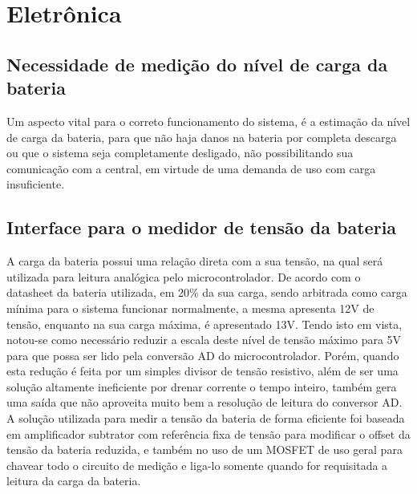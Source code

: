 \section{Eletrônica}

\subsection{Necessidade de medição do nível de carga da bateria}

Um aspecto vital para o correto funcionamento do sistema, é a estimação da nível de carga da bateria, para que não haja danos na bateria por completa descarga ou que o sistema seja completamente desligado, não possibilitando sua comunicação com a central, em virtude de uma demanda de uso com carga insuficiente.

\subsection{Interface para o medidor de tensão da bateria}

A carga da bateria possui uma relação direta com a sua tensão, na qual será utilizada para leitura analógica pelo microcontrolador. De acordo com o datasheet da bateria utilizada, em 20\% da sua carga, sendo arbitrada como carga mínima para o sistema funcionar normalmente, a mesma apresenta 12V de tensão, enquanto na sua carga máxima, é apresentado 13V.
Tendo isto em vista, notou-se como necessário reduzir a escala deste nível de tensão máximo para 5V para que possa ser lido pela conversão AD do microcontrolador. Porém, quando esta redução é feita por um simples divisor de tensão resistivo, além de ser uma solução altamente ineficiente por drenar corrente o tempo inteiro, também gera uma saída que não aproveita muito bem a resolução de leitura do conversor AD.
A solução utilizada para medir a tensão da bateria de forma eficiente foi baseada em amplificador subtrator com referência fixa de tensão para modificar o offset da tensão da bateria reduzida, e também no uso de um MOSFET de uso geral para chavear todo o circuito de medição e liga-lo somente quando for requisitada a leitura da carga da bateria.

